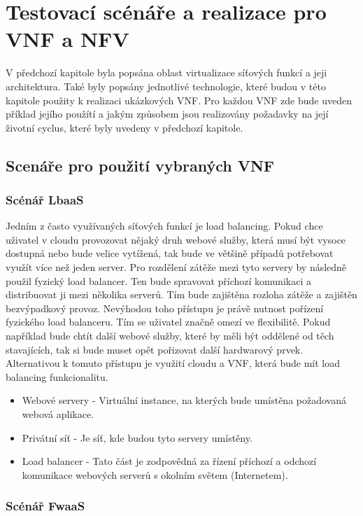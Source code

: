 \chapter{Testovací scénáře a realizace pro VNF a NFV}

V předchozí kapitole byla popsána oblast virtualizace síťových funkcí a jeji architektura. Také byly popsány jednotlivé technologie, které budou v této kapitole použity k realizaci ukázkových VNF. Pro každou VNF zde bude uveden příklad jejího použítí a jakým způsobem jsou realizovány požadavky na její životní cyclus, které byly uvedeny v předchozí kapitole.

\section{Scenáře pro použití vybraných VNF}

\subsection{Scénář LbaaS}

Jedním z často využívaných síťových funkcí je load balancing. Pokud chce uživatel v cloudu provozovat nějaký druh webové služby, která musí být vysoce dostupná nebo bude velice vytížená, tak bude ve většině případů potřebovat využít více než jeden server. Pro rozdělení zátěže mezi tyto servery by následně použil fyzický load balancer. Ten bude spravovat příchozí komunikaci a distribuovat ji mezi několika serverů. Tím bude zajištěna rozloha zátěže a zajištěn bezvýpadkový provoz. Nevýhodou toho přístupu je právě nutnost pořízení fyzického load balanceru. Tím se uživatel značně omezí ve flexibilitě. Pokud například bude chtít další webové služby, které by měli být oddělené od těch stavajících, tak si bude muset opět pořizovat další hardwarový prvek. Alternativou k tomuto přístupu je využití cloudu a VNF, která bude mít load balancing funkcionalitu.

\begin{itemize}
\item Webové servery - Virtuální instance, na kterých bude umístěna požadovaná webová aplikace.
\item Privátní síť - Je síť, kde budou tyto servery umístěny.
\item Load balancer - Tato část je zodpovědná za řízení příchozí a odchozí komunikace webových serverů s okolním světem (Internetem).
\end{itemize}

\subsection{Scénář FwaaS}

